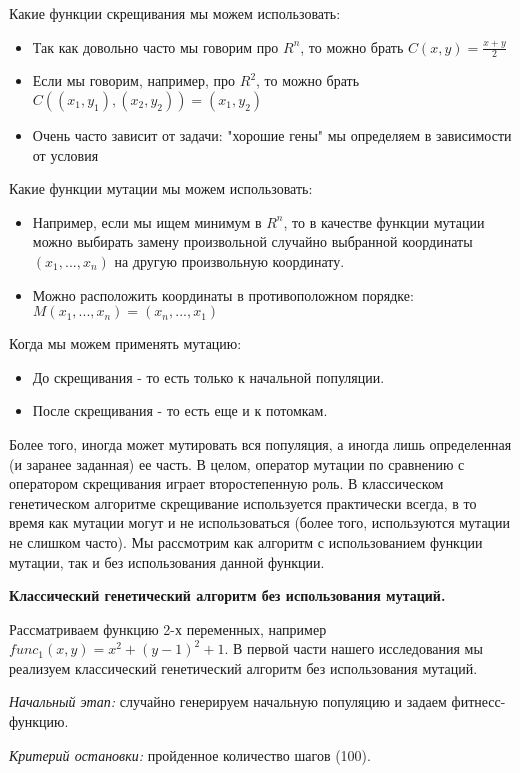 \documentclass[a4paper,11pt,russian]{article}
\begin{document}
Какие функции скрещивания мы можем использовать:
\begin{itemize}
\item Так как довольно часто мы говорим про $R^{n}$, то можно брать $C(x,y) = \frac{x+y}{2}$
\item Если мы говорим, например, про $R^2$, то можно брать $C((x_1, y_1), (x_2, y_2)) = (x_1, y_2)$
\item Очень часто зависит от задачи: "хорошие гены" мы определяем в зависимости от условия
 \end{itemize}
 
Какие функции мутации мы можем использовать:
\begin{itemize}
\item Например, если мы ищем минимум в $R^{n}$, то в качестве функции мутации можно выбирать замену произвольной случайно выбранной координаты $(x_1,...,x_n)$ на другую произвольную координату.
\item Можно расположить координаты в противоположном порядке: $M(x_1,...,x_n) = (x_n,...,x_1)$
\end{itemize}

Когда мы можем применять мутацию:
\begin{itemize}
\item До скрещивания - то есть только к начальной популяции.
\item После скрещивания - то есть еще и к потомкам.
\end{itemize}

Более того, иногда может мутировать вся популяция, а иногда лишь определенная (и заранее заданная) ее часть. В целом, оператор мутации по сравнению с оператором скрещивания играет второстепенную роль. В классическом генетическом алгоритме скрещивание используется практически всегда, в то время как мутации могут и не использоваться (более того, используются мутации не слишком часто). Мы рассмотрим как алгоритм с использованием функции мутации, так и без использования данной функции.

\hfill \break
\textbf{Классический генетический алгоритм без использования мутаций. }

Рассматриваем функцию 2-х переменных, например $func_{1}(x,y) = x^2 + (y-1)^2 + 1$. В первой части нашего исследования мы реализуем классический генетический алгоритм без использования мутаций.

\textit{Начальный этап:} случайно генерируем начальную популяцию и задаем фитнесс-функцию.

\textit{Критерий остановки:} пройденное количество шагов (100).
\end{document}
